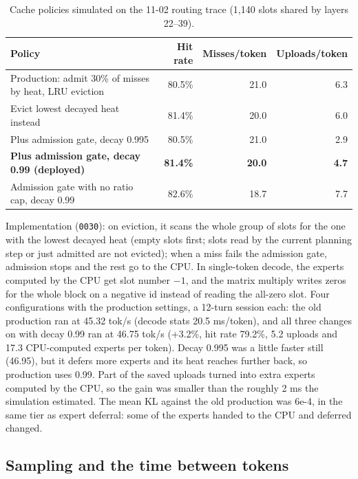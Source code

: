 \documentclass[11pt,a4paper]{article}
\newcommand{\code}[1]{\texttt{#1}}
\newcommand{\tps}{tok/s}
\begin{document}
\begin{table}[h]
  \centering
  \small
  \caption{Cache policies simulated on the 11-02 routing trace (1,140 slots shared by layers 22--39).}
  \label{tab:policy}
  \begin{tabular}{@{}l r r r@{}}
    \toprule
    Policy & Hit rate & Misses/token & Uploads/token \\
    \midrule
    Production: admit 30\% of misses by heat, LRU eviction & 80.5\% & 21.0 & 6.3 \\
    Evict lowest decayed heat instead & 81.4\% & 20.0 & 6.0 \\
    Plus admission gate, decay 0.995 & 80.5\% & 21.0 & 2.9 \\
    \textbf{Plus admission gate, decay 0.99 (deployed)} & \textbf{81.4\%} & \textbf{20.0} & \textbf{4.7} \\
    Admission gate with no ratio cap, decay 0.99 & 82.6\% & 18.7 & 7.7 \\
    \bottomrule
  \end{tabular}
\end{table}

Implementation (\code{0030}): on eviction, it scans the whole group of slots for the one with the lowest decayed heat (empty slots first; slots read by the current planning step or just admitted are not evicted); when a miss fails the admission gate, admission stops and the rest go to the CPU. In single-token decode, the experts computed by the CPU get slot number $-1$, and the matrix multiply writes zeros for the whole block on a negative id instead of reading the all-zero slot. Four configurations with the production settings, a 12-turn session each: the old production ran at 45.32 \tps{} (decode stats 20.5 ms/token), and all three changes on with decay 0.99 ran at 46.75 \tps{} (+3.2\%, hit rate 79.2\%, 5.2 uploads and 17.3 CPU-computed experts per token). Decay 0.995 was a little faster still (46.95), but it defers more experts and its heat reaches further back, so production uses 0.99. Part of the saved uploads turned into extra experts computed by the CPU, so the gain was smaller than the roughly 2 ms the simulation estimated. The mean KL against the old production was 6e-4, in the same tier as expert deferral: some of the experts handed to the CPU and deferred changed.

\subsection{Sampling and the time between tokens}
\label{sec:sampling}
\end{document}
